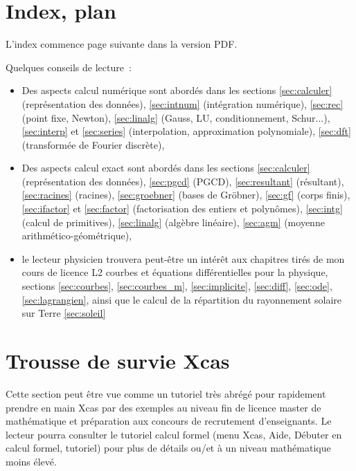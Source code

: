 \documentclass[a4paper,11pt]{article}
\begin{document}
\begin{giacjshere}
\tableofcontents 

\pagebreak 

\section{Index, plan} \label{sec:index}
L'index commence page suivante dans la version PDF.

Quelques conseils de lecture~:
\begin{itemize}
\item Des aspects calcul num\'erique sont abord\'es dans les sections
\ref{sec:calculer} (repr\'esentation des donn\'ees), 
\ref{sec:intnum} (int\'egration num\'erique),
\ref{sec:rec} (point fixe, Newton), \ref{sec:linalg} (Gauss, LU,
conditionnement, Schur...), \ref{sec:interp} et \ref{sec:series}
(interpolation, approximation polynomiale),
\ref{sec:dft} (transform\'ee de Fourier discr\`ete),
\item Des aspects calcul exact sont abord\'es dans les sections
\ref{sec:calculer} (repr\'esentation des donn\'ees), 
\ref{sec:pgcd} (PGCD), \ref{sec:resultant}
(r\'esultant), \ref{sec:racines} (racines), \ref{sec:groebner}
(bases de Gr\"obner), \ref{sec:gf} (corps
finis), \ref{sec:ifactor}
et \ref{sec:factor} (factorisation des entiers et polyn\^omes),
\ref{sec:intg} (calcul de primitives), \ref{sec:linalg} (alg\`ebre
lin\'eaire), \ref{sec:agm} (moyenne
arithm\'etico-g\'eom\'etrique), 
\item le lecteur physicien trouvera peut-\^etre un int\'er\^et
aux chapitres tir\'es de mon cours de licence L2 courbes et
\'equations diff\'erentielles pour la physique,
sections \ref{sec:courbes},
\ref{sec:courbes_m}, \ref{sec:implicite}, \ref{sec:diff},
\ref{sec:ode}, \ref{sec:lagrangien}, ainsi que le calcul de la
r\'epartition du rayonnement solaire sur Terre \ref{sec:soleil}
\end{itemize}
\printindex


\pagebreak

\section{Trousse de survie Xcas} \label{sec:survie}
Cette section peut \^etre vue comme un tutoriel tr\`es abr\'eg\'e 
pour rapidement
prendre en main Xcas par des exemples au niveau fin de licence
master de math\'ematique et pr\'eparation aux concours de recrutement
d'enseignants. Le lecteur pourra consulter le tutoriel calcul
formel (menu Xcas, Aide, D\'ebuter en calcul formel, tutoriel) pour
plus de d\'etails ou/et \`a un niveau math\'ematique moins \'elev\'e.


\end{giacjshere}
\end{document}
